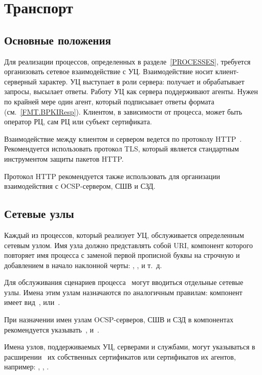\chapter{Транспорт}\label{TRANSPORT}

\section{Основные положения}\label{TRANSPORT.Common}

Для реализации процессов, определенных в разделе~\ref{PROCESSES}, требуется
организовать сетевое взаимодействие с УЦ. Взаимодействие носит клиент-серверный
характер.
%
УЦ выступает в роли сервера: получает и обрабатывает запросы, высылает ответы.
Работу УЦ как сервера поддерживают агенты. Нужен по крайней мере один агент,
который подписывает ответы формата~ (см.~\ref{FMT.BPKIResp}).
%
Клиентом, в зависимости от процесса, может быть оператор РЦ, сам РЦ или субъект
сертификата.

Взаимодействие между клиентом и сервером ведется по протоколу HTTP~\cite{HTTP}.
Рекомендуется использовать протокол TLS, который является стандартным 
инструментом защиты пакетов HTTP.

Протокол HTTP рекомендуется также использовать для организации взаимодействия с
OCSP-сервером, СШВ и СЗД.

\section{Сетевые узлы}\label{TRANSPORT.Endpoints}

Каждый из процессов, который реализует УЦ, обслуживается определенным сетевым
узлом. Имя узла должно представлять собой URI, компонент  которого
повторяет имя процесса с заменой первой прописной буквы на строчную и
добавлением в начало наклонной черты: , ,
 и т.~д.

Для обслуживания сценариев процесса~ могут вводиться отдельные
сетевые узлы. Имена этим узлам назначаются по аналогичным правилам: компонент
 имеет вид~,  или~.

При назначении имен узлам OCSP-серверов, СШВ и СЗД в компонентах  
рекомендуется указывать~,  и~.

Имена узлов, поддерживаемых УЦ, серверами и службами, могут указываться в
расширении~ их собственных сертификатов или сертификатов их
агентов, например:
, 
, 
.

